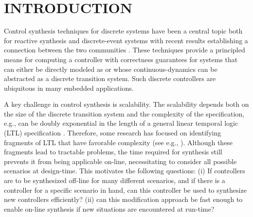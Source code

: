 \section{INTRODUCTION}



Control synthesis techniques for discrete systems have been a central topic both for reactive synthesis and discrete-event systems \cite{pnueli1989synthesis,ramadge1987supervisory} with recent results establishing a connection between the two communities \cite{ehlers2017supervisory,schmuckrelation}. These techniques provide a principled means for computing a controller with correctness guarantees for systems that can either be directly modeled as or whose continuous-dynamics can be abstracted as a discrete transition system. Such discrete controllers are ubiquitous in many embedded applications. 

A key challenge in control synthesis is scalability. The scalability depends both on the size of the discrete transition system and the complexity of the specification, e.g., can be doubly exponential in the length of a general linear temporal logic (LTL) specification \cite{pnueli1989synthesis}. Therefore, some research has focused on identifying fragments of LTL that have favorable complexity (see e.g., \cite{bloem2012synthesis,ehlers2011generalized,wolff2013efficient,Nilsson2017}). Although these fragments lead to tractable problems, the time required for synthesis still prevents it from being applicable on-line, necessitating to consider all possible scenarios at design-time. This motivates the following questions: (i) If controllers are to be synthesized off-line for many different scenarios, and if there is a controller for a specific scenario in hand, can this controller be used to synthesize new controllers efficiently? (ii) can this modification approach be fast enough to enable on-line synthesis if new situations are encountered at run-time? 

